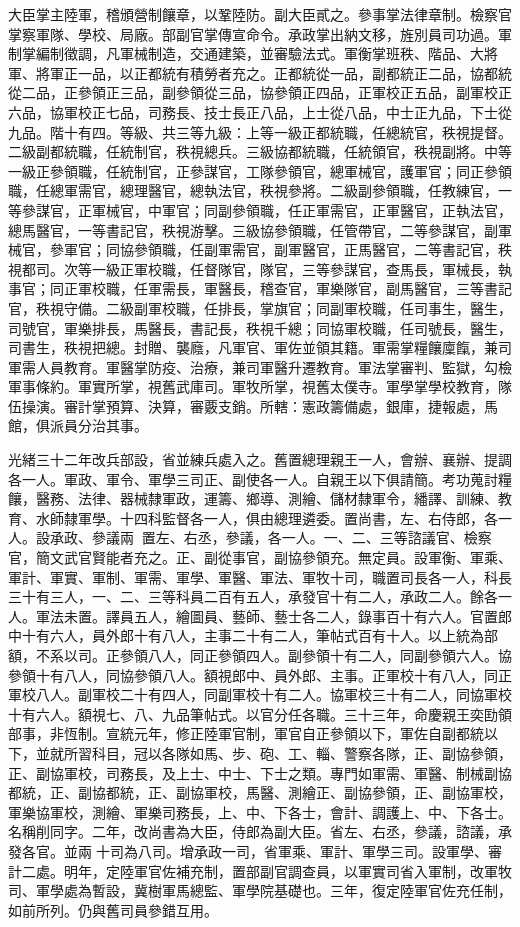 \begin{pinyinscope}
大臣掌主陸軍，稽頒營制饟章，以鞏陸防。副大臣貳之。參事掌法律章制。檢察官掌察軍隊、學校、局廠。部副官掌傳宣命令。承政掌出納文移，旌別員司功過。軍制掌編制徵調，凡軍械制造，交通建築，並審驗法式。軍衡掌班秩、階品、大將軍、將軍正一品，以正都統有積勞者充之。正都統從一品，副都統正二品，協都統從二品，正參領正三品，副參領從三品，協參領正四品，正軍校正五品，副軍校正六品，協軍校正七品，司務長、技士長正八品，上士從八品，中士正九品，下士從九品。階十有四。等級、共三等九級：上等一級正都統職，任總統官，秩視提督。二級副都統職，任統制官，秩視總兵。三級協都統職，任統領官，秩視副將。中等一級正參領職，任統制官，正參謀官，工隊參領官，總軍械官，護軍官；同正參領職，任總軍需官，總理醫官，總執法官，秩視參將。二級副參領職，任教練官，一等參謀官，正軍械官，中軍官；同副參領職，任正軍需官，正軍醫官，正執法官，總馬醫官，一等書記官，秩視游擊。三級協參領職，任管帶官，二等參謀官，副軍械官，參軍官；同協參領職，任副軍需官，副軍醫官，正馬醫官，二等書記官，秩視都司。次等一級正軍校職，任督隊官，隊官，三等參謀官，查馬長，軍械長，執事官；同正軍校職，任軍需長，軍醫長，稽查官，軍樂隊官，副馬醫官，三等書記官，秩視守備。二級副軍校職，任排長，掌旗官；同副軍校職，任司事生，醫生，司號官，軍樂排長，馬醫長，書記長，秩視千總；同協軍校職，任司號長，醫生，司書生，秩視把總。封贈、襲廕，凡軍官、軍佐並領其籍。軍需掌糧饟廩餼，兼司軍需人員教育。軍醫掌防疫、治療，兼司軍醫升遷教育。軍法掌審判、監獄，勾檢軍事條約。軍實所掌，視舊武庫司。軍牧所掌，視舊太僕寺。軍學掌學校教育，隊伍操演。審計掌預算、決算，審覈支銷。所轄：憲政籌備處，銀庫，捷報處，馬館，俱派員分治其事。

光緒三十二年改兵部設，省並練兵處入之。舊置總理親王一人，會辦、襄辦、提調各一人。軍政、軍令、軍學三司正、副使各一人。自親王以下俱請簡。考功蒐討糧饟，醫務、法律、器械隸軍政，運籌、鄉導、測繪、儲材隸軍令，繙譯、訓練、教育、水師隸軍學。十四科監督各一人，俱由總理遴委。置尚書，左、右侍郎，各一人。設承政、參議兩，置左、右丞，參議，各一人。一、二、三等諮議官、檢察官，簡文武官賢能者充之。正、副從事官，副協參領充。無定員。設軍衡、軍乘、軍計、軍實、軍制、軍需、軍學、軍醫、軍法、軍牧十司，職置司長各一人，科長三十有三人，一、二、三等科員二百有五人，承發官十有二人，承政二人。餘各一人。軍法未置。譯員五人，繪圖員、藝師、藝士各二人，錄事百十有六人。官置郎中十有六人，員外郎十有八人，主事二十有二人，筆帖式百有十人。以上統為部額，不系以司。正參領八人，同正參領四人。副參領十有二人，同副參領六人。協參領十有八人，同協參領八人。額視郎中、員外郎、主事。正軍校十有八人，同正軍校八人。副軍校二十有四人，同副軍校十有二人。協軍校三十有二人，同協軍校十有六人。額視七、八、九品筆帖式。以官分任各職。三十三年，命慶親王奕劻領部事，非恆制。宣統元年，修正陸軍官制，軍官自正參領以下，軍佐自副都統以下，並就所習科目，冠以各隊如馬、步、砲、工、輜、警察各隊，正、副協參領，正、副協軍校，司務長，及上士、中士、下士之類。專門如軍需、軍醫、制械副協都統，正、副協都統，正、副協軍校，馬醫、測繪正、副協參領，正、副協軍校，軍樂協軍校，測繪、軍樂司務長，上、中、下各士，會計、調護上、中、下各士。名稱削同字。二年，改尚書為大臣，侍郎為副大臣。省左、右丞，參議，諮議，承發各官。並兩十司為八司。增承政一司，省軍乘、軍計、軍學三司。設軍學、審計二處。明年，定陸軍官佐補充制，置部副官調查員，以軍實司省入軍制，改軍牧司、軍學處為暫設，冀樹軍馬總監、軍學院基礎也。三年，復定陸軍官佐充任制，如前所列。仍與舊司員參錯互用。


\end{pinyinscope}
